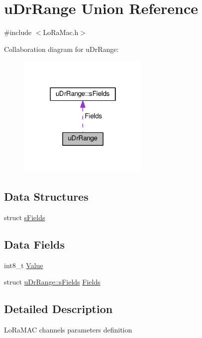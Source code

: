 \hypertarget{unionuDrRange}{}\section{u\+Dr\+Range Union Reference}
\label{unionuDrRange}


{\ttfamily \#include $<$Lo\+Ra\+Mac.\+h$>$}



Collaboration diagram for u\+Dr\+Range\+:
\nopagebreak
\begin{figure}[H]
\begin{center}
\leavevmode
\includegraphics[width=178pt]{unionuDrRange__coll__graph}
\end{center}
\end{figure}
\subsection*{Data Structures}
\begin{DoxyCompactItemize}
\item 
struct \hyperlink{structuDrRange_1_1sFields}{s\+Fields}
\end{DoxyCompactItemize}
\subsection*{Data Fields}
\begin{DoxyCompactItemize}
\item 
int8\+\_\+t \hyperlink{unionuDrRange_ae757567cbaea3fd419eb02b86d1d34db}{Value}
\item 
struct \hyperlink{structuDrRange_1_1sFields}{u\+Dr\+Range\+::s\+Fields} \hyperlink{unionuDrRange_a161a7247018060f7c0991b693888fef8}{Fields}
\end{DoxyCompactItemize}


\subsection{Detailed Description}
Lo\+Ra\+M\+AC channels parameters definition 

